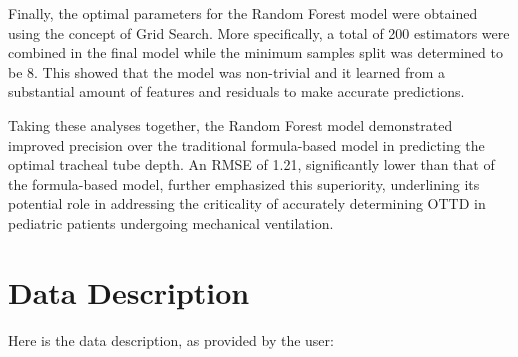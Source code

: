 \documentclass[11pt]{article}
\begin{document}
Finally, the optimal parameters for the Random Forest model were obtained using the concept of Grid Search. More specifically, a total of 200 estimators were combined in the final model while the minimum samples split was determined to be 8. This showed that the model was non-trivial and it learned from a substantial amount of features and residuals to make accurate predictions.

Taking these analyses together, the Random Forest model demonstrated improved precision over the traditional formula-based model in predicting the optimal tracheal tube depth. An RMSE of 1.21, significantly lower than that of the formula-based model, further emphasized this superiority, underlining its potential role in addressing the criticality of accurately determining OTTD in pediatric patients undergoing mechanical ventilation.


\clearpage
\appendix

\section{Data Description} \label{sec:data_description} Here is the data description, as provided by the user:
\end{document}
